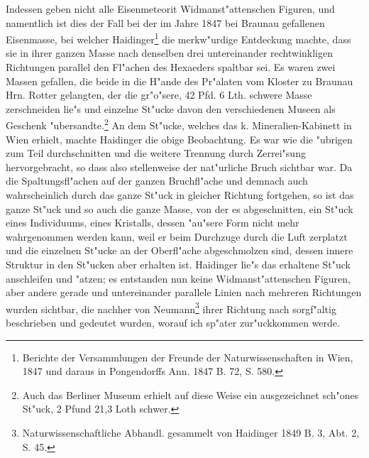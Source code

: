 \documentclass[a4paper, 11pt, oneside, german]{article}
\begin{document}
Indessen geben nicht alle Eisenmeteorit Widmanst"attenschen Figuren, und namentlich ist dies der Fall bei der im Jahre 1847 bei Braunau gefallenen Eisenmasse, bei welcher Haidinger\footnote{Berichte der Versammlungen der Freunde der Naturwissenschaften in Wien, 1847 und daraus in Pongendorffs Ann. 1847 B. 72, S. 580.} die merkw"urdige Entdeckung machte, dass sie in ihrer ganzen Masse nach denselben drei untereinander rechtwinkligen Richtungen parallel den Fl"achen des Hexaeders spaltbar sei. Es waren zwei Massen gefallen, die beide in die H"ande des Pr"alaten vom Kloster zu Braunau Hrn. Rotter gelangten, der die gr"o"sere, 42 Pfd. 6 Lth. schwere Masse zerschneiden lie"s und einzelne St"ucke davon den verschiedenen Museen als Geschenk "ubersandte.\footnote{Auch das Berliner Museum erhielt auf diese Weise ein ausgezeichnet sch"ones St"uck, 2 Pfund 21,3 Loth schwer.} An dem St"ucke, welches das k. Mineralien-Kabinett in Wien erhielt, machte Haidinger die obige Beobachtung. Es war wie die "ubrigen zum Teil durchschnitten und die weitere Trennung durch Zerrei"sung hervorgebracht, so dass also stellenweise der nat"urliche Bruch sichtbar war. Da die Spaltungsfl"achen auf der ganzen Bruchfl"ache und demnach auch wahrscheinlich durch das ganze St"uck in gleicher Richtung fortgehen, so ist das ganze St"uck und so auch die ganze Masse, von der es abgeschnitten, ein St"uck eines Individuums, eines Kristalls, dessen "au"sere Form nicht mehr wahrgenommen werden kann, weil er beim Durchzuge durch die Luft zerplatzt und die einzelnen St"ucke an der Oberfl"ache abgeschmolzen sind, dessen innere Struktur in den St"ucken aber erhalten ist. Haidinger lie"s das erhaltene St"uck anschleifen und "atzen; es entstanden nun keine Widmanst"attenschen Figuren, aber andere gerade und untereinander parallele Linien nach mehreren Richtungen wurden sichtbar, die nachher von Neumann\footnote{Naturwissenschaftliche Abhandl. gesammelt von Haidinger 1849 B. 3, Abt. 2, S. 45.} ihrer Richtung nach sorgf"altig beschrieben und gedeutet wurden, worauf ich sp"ater zur"uckkommen werde.
\end{document}
